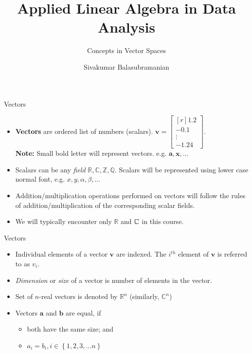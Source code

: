 \documentclass[aspectratio=169]{beamer}
\title{Applied Linear Algebra in Data Analysis}
\subtitle{Concepts in Vector Spaces}
\author{Sivakumar Balasubramanian}
\institute[Christian Medical College] %
{
  \inst{}%
  Department of Bioengineering\\
  Christian Medical College, Bagayam\\
  Vellore 632002
}
\date{}
\let\olditem\item
\renewcommand{\item}{\setlength{\itemsep}{\fill}\olditem}
\def\mb{\ensuremath\mathbb}
\begin{document}
\begin{frame}
  \titlepage
\end{frame}


\begin{frame}[t]{Vectors}
\begin{itemize}
  \item \textbf{Vectors} are ordered list of numbers (scalars). $\mathbf{v} = \begin{bmatrix*}[r] 1.2 \\ -0.1 \\ \vdots \\-1.24 \end{bmatrix*}$.\\
  \textbf{Note:} Small bold letter will represent vectors. e.g. $\mathbf{a}, \mathbf{x}, \ldots $
  
  \item Scalars can be any \textit{field} $\mathbb{R}, \mathbb{C}, \mathbb{Z}, \mathbb{Q}$. Scalars will be represented using lower case normal font, e.g. $x, y, \alpha, \beta, \ldots$
  
  \item Addition/multiplication operations performed on vectors will follow the rules of addition/multiplication of the corresponding scalar fields.
  
  \item We will typically encounter only $\mathbb{R}$ and $\mb{C}$ in this course.
\end{itemize}
\end{frame}


\begin{frame}[t]{Vectors}
\begin{itemize}
  \item Individual elements of a vector $\mathbf{v}$ are indexed. The $i^{th}$ element of $\mathbf{v}$ is referred to as $v_i$.

  \item \textit{Dimension} or \textit{size} of a vector is number of elements in the vector.
  
  \item Set of $n$-real vectors is denoted by $\mathbb{R}^n$ (similarly, $\mathbb{C}^n$)
  
  \item Vectors $\mathbf{a}$ and $\mathbf{b}$ are equal, if
  \begin{itemize}
    \item both have the same size; and
    \item $a_i = b_i, i \in \left\{1, 2, 3, \ldots n\right\}$
  \end{itemize}
  \end{itemize}
\end{frame}
\end{document}
